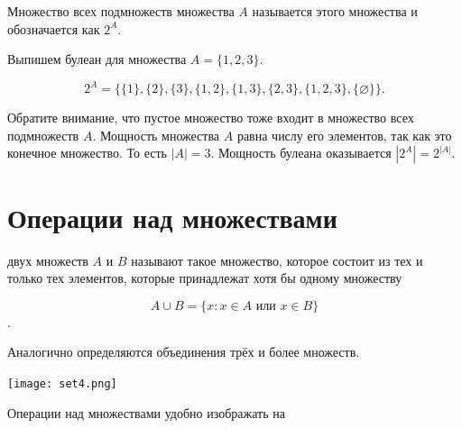 \documentclass[12pt, a4paper]{article}
\begin{document}
\begin{mydef}
Множество всех подмножеств множества $A$ называется  этого множества и обозначается как $2^{A}.$
\end{mydef}

\begin{myex} 
Выпишем булеан для множества $A = \{1,2,3\}.$

\[
2^A = \{\{1\},\{2\},\{3\},\{1,2\},\{1,3\},\{2,3\},\{1,2,3\},\{\varnothing\}\}.
\]
\end{myex} 

Обратите внимание, что пустое множество тоже входит в множество всех подмножеств $A.$ Мощность множества $A$ равна числу его элементов, так как это конечное множество. То есть $|A| = 3.$ Мощность булеана оказывается $|2^A| = 2^{|A|}.$ 


\section{Операции над множествами}

\begin{mydef} 
     двух множеств $A$ и $B$ называют такое множество, которое состоит из тех и только тех элементов, которые принадлежат хотя бы одному множеству
    
    \[A \cup B = \{x: x \in A \text{ или } x \in B\}\].
    
    Аналогично определяются объединения трёх и более множеств.
\end{mydef} 

\begin{center}
    \texttt{[image: set4.png]}
\end{center}

Операции над множествами удобно изображать на 

\begin{center}
\end{center}
\end{document}
